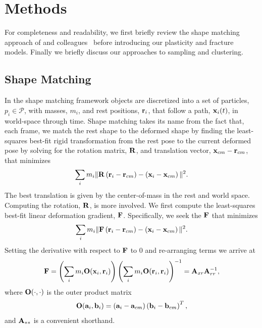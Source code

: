 \documentclass[review]{acmsiggraph}
\begin{document}
\section{Methods}
For completeness and readability, we first briefly review the shape matching approach of \Mueller and colleagues~ before
introducing our plasticity and fracture models.  Finally we briefly discuss our approaches to sampling and clustering.
\subsection{Shape Matching}
\label{sec:ShapeMatching}
In the shape matching framework
objects are discretized into a set of particles, $p_i\in\mathcal{P}$, with masses, $m_i$, and rest positions, $\mathit{\mathbf{r}}_i$, 
that follow a path, $\mathit{\mathbf{x}}_i(t)$, in world-space through time.  
Shape matching takes its name from the fact that, each frame, we match the rest shape to 
the deformed shape by finding
the least-squares best-fit rigid transformation from the rest pose
to the current deformed pose by
solving for the rotation matrix, $\mathit{\mathbf{R}}$, and translation
vector, $\mathit{\mathbf{x}}_{cm}-\mathit{\mathbf{r}}_{cm}$, that minimizes
\begin{equation}
\label{eq:sm}
\sum_i m_i \| \mathit{\mathbf{R}}\left(\mathit{\mathbf{r}}_i - \mathit{\mathbf{r}}_{cm}\right)-\left(\mathit{\mathbf{x}}_i-\mathit{\mathbf{x}}_{cm}\right)\|^2.
\end{equation}
The best translation is given by the center-of-mass in the rest and world space.  
Computing the rotation, $\mathit{\mathbf{R}}$, is more involved.  
We first compute the least-squares best-fit linear deformation gradient, $\mathit{\mathbf{F}}$.
Specifically, we seek the $\mathit{\mathbf{F}}$ that minimizes
\begin{equation}
\sum_i m_i \| \mathit{\mathbf{F}}\left(\mathit{\mathbf{r}}_i - \mathit{\mathbf{r}}_{cm}\right)-\left(\mathit{\mathbf{x}}_i-\mathit{\mathbf{x}}_{cm}\right)\|^2.
\end{equation}
Setting the derivative with respect to $\mathit{\mathbf{F}}$ to $0$ and re-arranging terms we arrive at
\begin{equation}
\label{eq:defgrad}
\mathit{\mathbf{F}} = \left(\sum_i m_i \mathit{\mathbf{O}}(\mathit{\mathbf{x}}_i,\mathit{\mathbf{r}}_i)\right)\left(\sum_im_i\mathit{\mathbf{O}}(\mathit{\mathbf{r}}_i,\mathit{\mathbf{r}}_i)\right)^{-1} = \mathit{\mathbf{A}}_{xr}\mathit{\mathbf{A}}_{rr}^{-1},
\end{equation}
where $\mathit{\mathbf{O}}(\cdot,\cdot)$ is the outer product matrix
\begin{equation}
\mathit{\mathbf{O}}(\mathit{\mathbf{a}}_i,\mathit{\mathbf{b}}_i) = \left(\mathit{\mathbf{a}}_i-\mathit{\mathbf{a}}_{cm}\right)\left(\mathit{\mathbf{b}}_{i}-\mathit{\mathbf{b}}_{cm}\right)^T,
\end{equation}
and $\mathit{\mathbf{A}}_{**}$ is a convenient shorthand.
\end{document}
